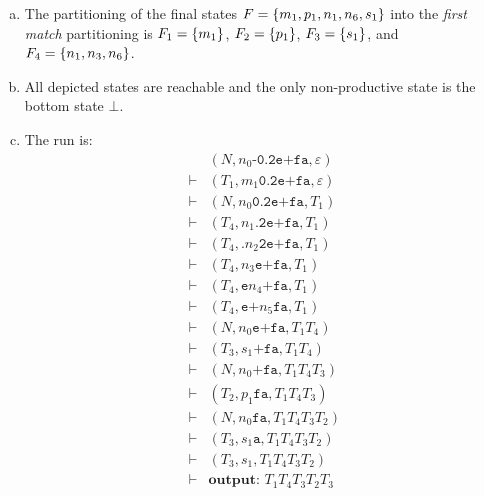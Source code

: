 \begin{solution}
\begin{enumerate}[(a)]
  \item
    The partitioning of the final states $F=\left\{ m_1, p_1, n_1, n_6, s_1 \right\}$ into the \emph{first match} partitioning is $F_1 =\left\{ m_1 \right\}$, $F_2 =\left\{ p_1 \right\}$, $F_3 =\left\{ s_1 \right\}$, and $F_4=\left\{ n_1, n_3, n_6 \right\}$.

  \item
    All depicted states are reachable and the only non-productive state is the bottom state $\bot$.

  \item
    The run is:
    \begin{align*}
               & (N,   n_0 \texttt{-0.2e+fa}, \varepsilon) \\
        \vdash & (T_1, m_1 \texttt{0.2e+fa}, \varepsilon) \\
        \vdash & (N,   n_0 \texttt{0.2e+fa}, T_1) \\
        \vdash & (T_4, n_1 \texttt{.2e+fa}, T_1) \\
        \vdash & (T_4, \texttt{.}n_2 \texttt{2e+fa}, T_1) \\
        \vdash & (T_4, n_3 \texttt{e+fa}, T_1) \\
        \vdash & (T_4, \texttt{e}n_4 \texttt{+fa}, T_1) \\
        \vdash & (T_4, \texttt{e+}n_5 \texttt{fa}, T_1) \\
        \vdash & (N,   n_0 \texttt{e+fa}, T_1T_4) \\
        \vdash & (T_3, s_1 \texttt{+fa}, T_1T_4) \\
        \vdash & (N, n_0 \texttt{+fa}, T_1T_4T_3) \\
        \vdash & (T_2, p_1 \texttt{fa}, T_1T_4T_3) \\
        \vdash & (N, n_0 \texttt{fa}, T_1T_4T_3T_2) \\
        \vdash & (T_3, s_1 \texttt{a}, T_1T_4T_3T_2) \\
        \vdash & (T_3, s_1, T_1T_4T_3T_2) \\
        \vdash & \textbf{output: }T_1T_4T_3T_2T_3
    \end{align*}
\end{enumerate}
\end{solution}

